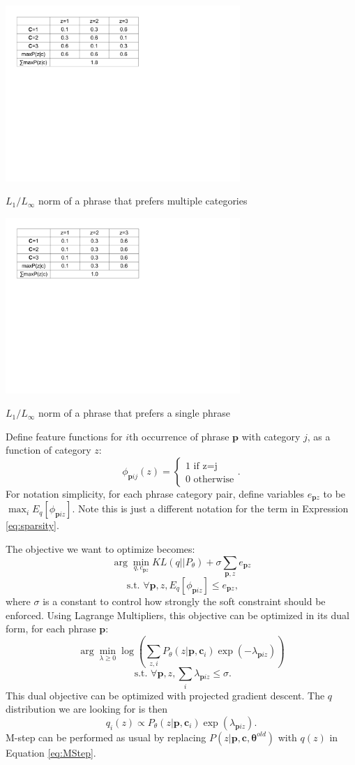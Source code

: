 \begin{table}[h]
  \label{tab:sparse}

  \centering
  \includegraphics[width=3.5in]{pr-clustering/sparse0}
  \caption{$L_1/L_{\infty}$ norm of a phrase
  that prefers multiple categories}
  \includegraphics[width=3.5in]{pr-clustering/sparse1}
  \caption{$L_1/L_{\infty}$ norm of a phrase
  that prefers a single phrase}
\end{table}

Define feature functions for $i$th occurrence of phrase $\textbf{p}$
with category $j$,
as a function of category $z$:
\[
\phi_{\textbf{p}ij}(z)=
\begin{cases}
1\text{ if z=j}\\
0\text{ otherwise}
\end{cases}.
\]
For notation simplicity, for
each phrase category pair, 
define variables 
$e_{\textbf{p}z}$ to be 
$\max_i E_q[\phi_{\textbf{p}iz}]$. Note this is just
a different notation for the term in
Expression \ref{eq:sparsity}.

The objective we want to optimize becomes:
\[
\arg\min_{q,c_{\textbf{p}z}} KL(q||P_{\theta}) + 
\sigma \sum_{\textbf{p},z}e_{\textbf{p}z}
\]
\[
\text{ s.t. }\forall \textbf{p},z,
E_q[\phi_{\textbf{p}iz}]\leq e_{\textbf{p}z},
\]
where $\sigma$ is a constant to control
how strongly the soft constraint should
be enforced.
Using Lagrange Multipliers, this objective can
be optimized in its dual form,
for each phrase $\textbf{p}$:
\[
\arg\min_{\lambda\geq 0} \log 
(\sum_{z,i} P_\theta(z|\textbf{p},\textbf{c}_i)
\exp (-\lambda_{\textbf{p}iz}))
\]
\[
\text{ s.t. } \forall \textbf{p},z,
\sum_i \lambda_{\textbf{p}iz}\leq \sigma.
\]
This dual objective can be optimized with projected gradient
descent.
The $q$ distribution we are looking for is then
\[
q_i(z)\propto P_{\theta}(z|\textbf{p},\textbf{c}_i)
\exp(\lambda_{\textbf{p}iz}).
\]
M-step can be performed as usual by replacing
$P(z|\textbf{p},\textbf{c},
\boldsymbol\theta^{old})$ with 
$q(z)$ in Equation \ref{eq:MStep}.

